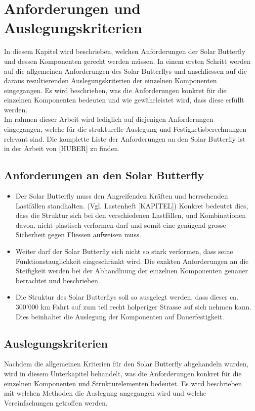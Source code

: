 \section{Anforderungen und Auslegungskriterien}
In diesem Kapitel wird beschrieben, welchen Anforderungen der Solar Butterfly und dessen Komponenten gerecht werden müssen. In einem ersten Schritt werden auf die allgemeinen Anforderungen des Solar Butterflys und anschliessen auf die daraus resultierenden Auslegungskriterien der einzelnen Komponenten eingegangen. Es wird beschrieben, was die Anforderungen konkret für die einzelnen Komponenten bedeuten und wie gewährleistet wird, dass diese erfüllt werden.\\
Im rahmen dieser Arbeit wird lediglich auf diejenigen Anforderungen eingegangen, welche für die strukturelle Auslegung und Festigketisberechnungen relevant sind. Die komplette Liste der Anforderungen an den Solar Butterfly ist in der Arbeit von [HUBER] zu finden.

\subsection{Anforderungen an den Solar Butterfly}
\begin{itemize}
  \item Der Solar Butterfly muss den Angreifenden Kräften und herrschenden Lastfällen standhalten. (Vgl. Lastenheft [KAPITEL]) Konkret bedeutet dies, dass die Struktur sich bei den verschiedenen Lastfällen, und Kombinationen davon, nicht plastisch verformen darf und somit eine genügend grosse Sicherheit gegen Fliessen aufweisen muss.\\
  \item Weiter darf der Solar Butterfly sich nicht so stark verformen, dass seine Funktionstauglichkeit eingeschränkt wird. Die exakten Anforderungen an die Steifigkeit werden bei der Abhandlnung der einzelnen Komponenten genauer betrachtet und beschrieben.\\
  \item Die Struktur des Solar Butterflys soll so ausgelegt werden, dass dieser ca. 300'000 km Fahrt auf zum teil recht holperiger Strasse auf sich nehmen kann. Dies beinhaltet die Auslegung der Komponenten auf Dauerfestigkeit.
\end{itemize}


\subsection{Auslegungskriterien}
Nachdem die allgemeinen Kriterien für den Solar Butterfly abgehandeln wurden, wird in diesem Unterkapitel behandelt, was die Anforderungen konkret für die einzelnen Komponenten und Strukturelementen bedeutet. Es wird beschrieben mit welchen Methoden die Auslegung angegangen wird und welche Vereinfachungen getroffen werden.\\

